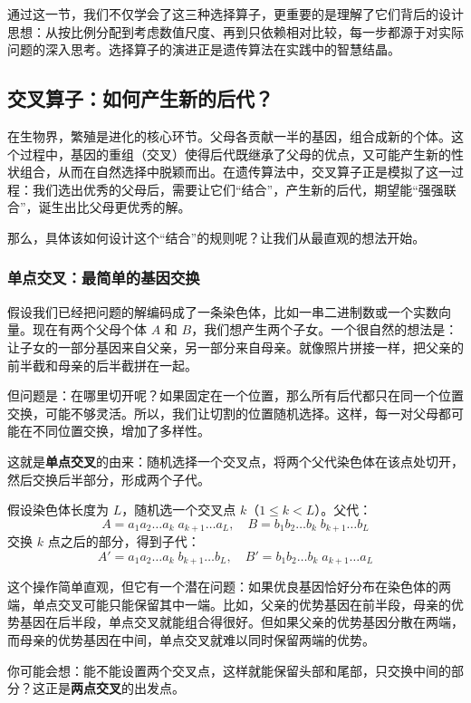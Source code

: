 \documentclass[lang=cn,zihao=-4,a4paper,fontset=windows]{beautybook}
\begin{document}
通过这一节，我们不仅学会了这三种选择算子，更重要的是理解了它们背后的设计思想：从按比例分配到考虑数值尺度、再到只依赖相对比较，每一步都源于对实际问题的深入思考。选择算子的演进正是遗传算法在实践中的智慧结晶。

\subsection{交叉算子：如何产生新的后代？}

在生物界，繁殖是进化的核心环节。父母各贡献一半的基因，组合成新的个体。这个过程中，基因的重组（交叉）使得后代既继承了父母的优点，又可能产生新的性状组合，从而在自然选择中脱颖而出。在遗传算法中，交叉算子正是模拟了这一过程：我们选出优秀的父母后，需要让它们“结合”，产生新的后代，期望能“强强联合”，诞生出比父母更优秀的解。

那么，具体该如何设计这个“结合”的规则呢？让我们从最直观的想法开始。

\subsubsection{单点交叉：最简单的基因交换}

假设我们已经把问题的解编码成了一条染色体，比如一串二进制数或一个实数向量。现在有两个父母个体 \(A\) 和 \(B\)，我们想产生两个子女。一个很自然的想法是：让子女的一部分基因来自父亲，另一部分来自母亲。就像照片拼接一样，把父亲的前半截和母亲的后半截拼在一起。

但问题是：在哪里切开呢？如果固定在一个位置，那么所有后代都只在同一个位置交换，可能不够灵活。所以，我们让切割的位置随机选择。这样，每一对父母都可能在不同位置交换，增加了多样性。

这就是\textbf{单点交叉}的由来：随机选择一个交叉点，将两个父代染色体在该点处切开，然后交换后半部分，形成两个子代。

假设染色体长度为 \(L\)，随机选一个交叉点 \(k\)（\(1 \le k < L\)）。父代：
\[
A = a_1 a_2 \dots a_k \; a_{k+1} \dots a_L, \quad B = b_1 b_2 \dots b_k \; b_{k+1} \dots b_L
\]
交换 \(k\) 点之后的部分，得到子代：
\[
A' = a_1 a_2 \dots a_k \; b_{k+1} \dots b_L, \quad B' = b_1 b_2 \dots b_k \; a_{k+1} \dots a_L
\]

这个操作简单直观，但它有一个潜在问题：如果优良基因恰好分布在染色体的两端，单点交叉可能只能保留其中一端。比如，父亲的优势基因在前半段，母亲的优势基因在后半段，单点交叉就能组合得很好。但如果父亲的优势基因分散在两端，而母亲的优势基因在中间，单点交叉就难以同时保留两端的优势。

你可能会想：能不能设置两个交叉点，这样就能保留头部和尾部，只交换中间的部分？这正是\textbf{两点交叉}的出发点。
\end{document}
